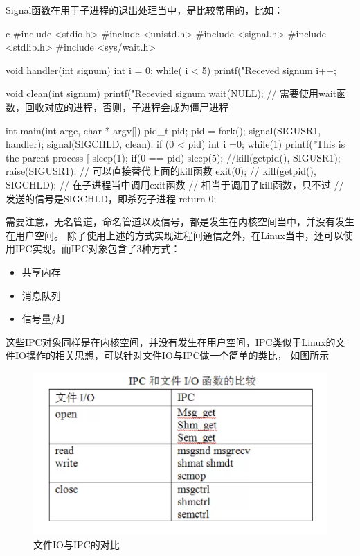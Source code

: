 Signal函数在用于子进程的退出处理当中，是比较常用的，比如：
\begin{code-block}{c}
#include <stdio.h>
#include <unistd.h>
#include <signal.h>
#include <stdlib.h>
#include <sys/wait.h>

void handler(int signum)
{
        int i = 0;
        while( i < 5)
        {
                printf("Receved signum %
                i++;
        }
}

void clean(int signum)
{
        printf("Recevied signum %
        wait(NULL); // 需要使用wait函数，回收对应的进程，否则，子进程会成为僵尸进程
}

int main(int argc, char * argv[])
{
        pid_t pid;
        pid = fork();
        signal(SIGUSR1, handler);
        signal(SIGCHLD, clean);
        if (0 < pid)
        {
                int i =0;
                while(1)
                {
                        printf("This is the parent process [%
                        sleep(1);
                }
        }
        if(0 == pid)
        {
                sleep(5);
                //kill(getpid(), SIGUSR1);
                raise(SIGUSR1); // 可以直接替代上面的kill函数
                exit(0); // kill(getpid(), SIGCHLD); // 在子进程当中调用exit函数
                                                     // 相当于调用了kill函数，只不过
                                                     // 发送的信号是SIGCHLD，即杀死子进程
        }
        return 0;
}
\end{code-block}

需要注意，无名管道，命名管道以及信号，都是发生在内核空间当中，并没有发生在用户空间。
除了使用上述的方式实现进程间通信之外，在Linux当中，还可以使用IPC实现。而IPC对象包含了3种方式：
\begin{itemize}
  \item 共享内存
  \item 消息队列
  \item 信号量/灯
\end{itemize}

这些IPC对象同样是在内核空间，并没有发生在用户空间，IPC类似于Linux的文件IO操作的相关思想，可以针对文件IO与IPC做一个简单的类比，
如图所示
\begin{figure}[H]
  \centering
  \includegraphics[width=\linewidth]{IPC.png}
  \caption{文件IO与IPC的对比}
  \label{fig:IPC}
\end{figure}

